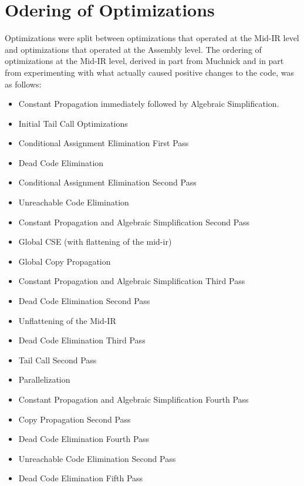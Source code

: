 \documentclass[11pt]{article}
\begin{document}
\section {Odering of Optimizations} 
\label{sec:order}

Optimizations were split between optimizations that operated at the
Mid-IR level and optimizations that operated at the Assembly
level. The ordering of optimizations at the Mid-IR level, derived in
part from Muchnick and in part from experimenting with what actually
caused positive changes to the code, was as follows: 

\begin{itemize}

\item Constant Propagation immediately followed by Algebraic
  Simplification. 

\item Initial Tail Call Optimizations 

\item Conditional Assignment Elimination First Pass

\item Dead Code Elimination

\item Conditional Assignment Elimination Second Pass

\item Unreachable Code Elimination

\item Constant Propagation and Algebraic Simplification Second Pass

\item Global CSE (with flattening of the mid-ir)

\item Global Copy Propagation

\item Constant Propagation and Algebraic Simplification Third Pass

\item Dead Code Elimination Second Pass

\item Unflattening of the Mid-IR

\item Dead Code Elimination Third Pass

\item Tail Call Second Pass

\item Parallelization 

\item Constant Propagation and Algebraic Simplification Fourth Pass

\item Copy Propagation Second Pass

\item Dead Code Elimination Fourth Pass

\item Unreachable Code Elimination Second Pass

\item Dead Code Elimination Fifth Pass

\end{itemize}
\end{document}
